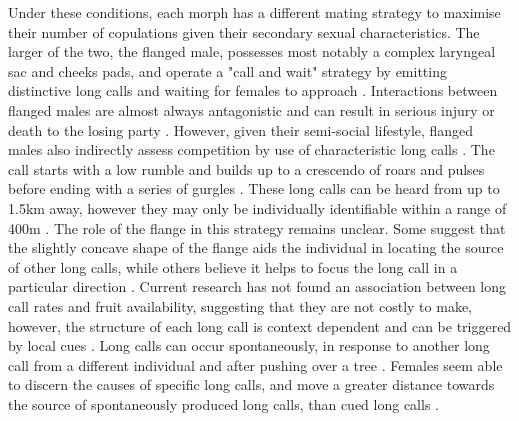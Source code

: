 Under these conditions, each morph has a different mating strategy to maximise their number of copulations given their secondary sexual characteristics. The larger of the two, the flanged male, possesses most notably a complex laryngeal sac and cheeks pads, and operate a "call and wait" strategy by emitting distinctive long calls and waiting for females to approach \citep{Utami.2002km8, Kunz.2023}. Interactions between flanged males are almost always antagonistic and can result in serious injury or death to the losing party \citep{Setia.2008}. However, given their semi-social lifestyle, flanged males also indirectly assess competition by use of characteristic long calls \citep{Spillmann.2016}. The call starts with a low rumble and builds up to a crescendo of roars and pulses before ending with a series of gurgles \citep{Spillmann.2010}. These long calls can be heard from up to 1.5km away, however they may only be individually identifiable within a range of 400m \citep{Spillmann.2016}. The role of the flange in this strategy remains unclear. Some suggest that the slightly concave shape of the flange aids the individual in locating the source of other long calls, while others believe it helps to focus the long call in a particular direction \citep{Galdikas.1983,Mitani.1985ak1m}. Current research has not found an association between long call rates and fruit availability, suggesting that they are not costly to make, however, the structure of each long call is context dependent and can be triggered by local cues \citep{Spillmann.2016}. Long calls can occur spontaneously, in response to another long call from a different individual and after pushing over a tree \citep{Delgado.2008}. Females seem able to discern the causes of specific long calls, and move a greater distance towards the source of spontaneously produced long calls, than cued long calls \citep{Spillmann.2016}.  

